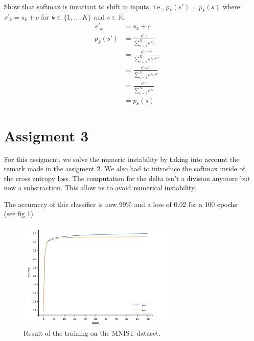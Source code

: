 \documentclass{article}
\begin{document}
Show that softmax is invariant to shift in inputs, i.e., $p_k(s') = p_k(s)$ where $s'_k = s_k + c$ for $k \in \{1,...,K\}$ and $c \in \mathbb{R}$.
\begin{align*}
    s'_k &= s_k + c \\
    p_k(s') &= \frac{e^{s'_k}}{\sum_{c=1}^K e^{s'_c}} \\
            &= \frac{e^{s_k + c}}{\sum_{c=1}^K e^{s_c + c}} \\
            &= \frac{e^{s_k} e^c}{\sum_{c=1}^K e^{s_c} e^c} \\
            &= \frac{e^{s_k}}{\sum_{c=1}^K e^{s_c}} \\
            &= p_k(s)
\end{align*}


\section{Assigment 3}

For this assigment, we solve the numeric instability by taking into account the remark made in the assigment 2.
We also had to introduce the softmax inside of the cross entropy loss. 
The computation for the delta isn't a division anymore but now a substraction. This allow us to avoid numerical instability. 

The accuraccy of this classifier is now 99\% and a loss of 0.02 for a 100 epochs (see fig \ref{fig:MNIST}).

\begin{figure}[h]
    \centering
    \includegraphics[width=0.7\textwidth]{images/Figure_5.png}
    \caption{Result of the training on the MNIST dataset.}
    \label{fig:MNIST}
\end{figure} 
\end{document}

